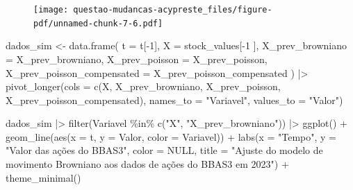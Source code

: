 \documentclass[
  letterpaper,
  DIV=11,
  numbers=noendperiod]{scrreprt}
\newenvironment{Shaded}{\begin{snugshade}}{\end{snugshade}}
\newcommand{\AttributeTok}[1]{\textcolor[rgb]{0.40,0.45,0.13}{#1}}
\newcommand{\ConstantTok}[1]{\textcolor[rgb]{0.56,0.35,0.01}{#1}}
\newcommand{\DecValTok}[1]{\textcolor[rgb]{0.68,0.00,0.00}{#1}}
\newcommand{\FunctionTok}[1]{\textcolor[rgb]{0.28,0.35,0.67}{#1}}
\newcommand{\NormalTok}[1]{\textcolor[rgb]{0.00,0.23,0.31}{#1}}
\newcommand{\OtherTok}[1]{\textcolor[rgb]{0.00,0.23,0.31}{#1}}
\newcommand{\SpecialCharTok}[1]{\textcolor[rgb]{0.37,0.37,0.37}{#1}}
\newcommand{\StringTok}[1]{\textcolor[rgb]{0.13,0.47,0.30}{#1}}
\begin{document}
\begin{figure}[H]

{\centering \texttt{[image: questao-mudancas-acypreste\_files/figure-pdf/unnamed-chunk-7-6.pdf]}

}

\end{figure}

\begin{Shaded}
\begin{Highlighting}[]
\NormalTok{dados\_sim }\OtherTok{\textless{}{-}} \FunctionTok{data.frame}\NormalTok{(}
    \AttributeTok{t =}\NormalTok{ t[}\SpecialCharTok{{-}}\DecValTok{1}\NormalTok{],}
    \AttributeTok{X =}\NormalTok{ stock\_values[}\SpecialCharTok{{-}}\DecValTok{1}\NormalTok{ ],}
    \AttributeTok{X\_prev\_browniano =}\NormalTok{ X\_prev\_browniano,}
    \AttributeTok{X\_prev\_poisson =}\NormalTok{ X\_prev\_poisson,}
    \AttributeTok{X\_prev\_poisson\_compensated =}\NormalTok{ X\_prev\_poisson\_compensated}
\NormalTok{) }\SpecialCharTok{|\textgreater{}} 
\FunctionTok{pivot\_longer}\NormalTok{(}\AttributeTok{cols =} \FunctionTok{c}\NormalTok{(X, X\_prev\_browniano, X\_prev\_poisson, X\_prev\_poisson\_compensated),}
             \AttributeTok{names\_to =} \StringTok{"Variavel"}\NormalTok{,}
             \AttributeTok{values\_to =} \StringTok{"Valor"}\NormalTok{) }
\end{Highlighting}
\end{Shaded}

\begin{Shaded}
\begin{Highlighting}[]
\NormalTok{dados\_sim }\SpecialCharTok{|\textgreater{}} 
    \FunctionTok{filter}\NormalTok{(Variavel }\SpecialCharTok{\%in\%} \FunctionTok{c}\NormalTok{(}\StringTok{"X"}\NormalTok{, }\StringTok{"X\_prev\_browniano"}\NormalTok{)) }\SpecialCharTok{|\textgreater{}} 
    \FunctionTok{ggplot}\NormalTok{() }\SpecialCharTok{+}
    \FunctionTok{geom\_line}\NormalTok{(}\FunctionTok{aes}\NormalTok{(}\AttributeTok{x =}\NormalTok{ t, }\AttributeTok{y =}\NormalTok{ Valor, }\AttributeTok{color =}\NormalTok{ Variavel)) }\SpecialCharTok{+}
    \FunctionTok{labs}\NormalTok{(}\AttributeTok{x =} \StringTok{"Tempo"}\NormalTok{,}
         \AttributeTok{y =} \StringTok{"Valor das ações do BBAS3"}\NormalTok{,}
         \AttributeTok{color =} \ConstantTok{NULL}\NormalTok{,}
         \AttributeTok{title =} \StringTok{"Ajuste do modelo de movimento Browniano}
\StringTok{          aos dados de ações do BBAS3 em 2023"}\NormalTok{) }\SpecialCharTok{+}
    \FunctionTok{theme\_minimal}\NormalTok{()}
\end{Highlighting}
\end{Shaded}
\end{document}
